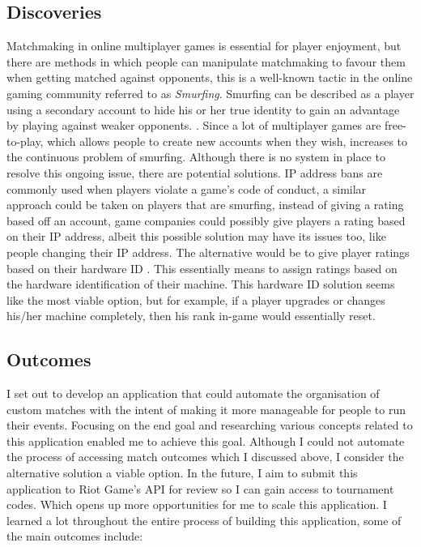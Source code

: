 \subsection{Discoveries}
Matchmaking in online multiplayer games is essential for player enjoyment, but there are methods in which people can manipulate matchmaking to favour them when getting matched against opponents, this is a well-known tactic in the online gaming community referred to as \textit{Smurfing}. Smurfing can be described as a player using a secondary account to hide his or her true identity to gain an advantage by playing against weaker opponents. \cite{hippe2017evaluation}. Since a lot of multiplayer games are free-to-play, which allows people to create new accounts when they wish, increases to the continuous problem of smurfing. Although there is no system in place to resolve this ongoing issue, there are potential solutions. IP address bans are commonly used when players violate a game's code of conduct, a similar approach could be taken on players that are smurfing, instead of giving a rating based off an account, game companies could possibly give players a rating based on their IP address, albeit this possible solution may have its issues too, like people changing their IP address. The alternative would be to give player ratings based on their hardware ID \cite{weinberg1999hardware}. This essentially means to assign ratings based on the hardware identification of their machine. This hardware ID solution seems like the most viable option, but for example, if a player upgrades or changes his/her machine completely, then his rank in-game would essentially reset.

\subsection{Outcomes}
I set out to develop an application that could automate the organisation of custom matches with the intent of making it more manageable for people to run their events. Focusing on the end goal and researching various concepts related to this application enabled me to achieve this goal. Although I could not automate the process of accessing match outcomes which I discussed above, I consider the alternative solution a viable option. In the future, I aim to submit this application to Riot Game's API for review so I can gain access to tournament codes. Which opens up more opportunities for me to scale this application.\hfill \break
I learned a lot throughout the entire process of building this application, some of the main outcomes include:

